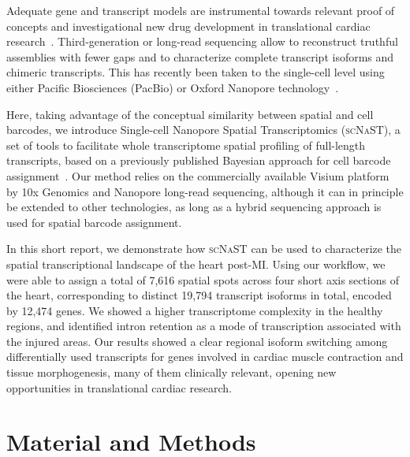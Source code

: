 \documentclass[utf8]{FrontiersinHarvard} %
\newcommand{\scnast}{\textsc{scNaST}\xspace}
\begin{document}
Adequate gene and transcript models are instrumental towards relevant proof of concepts and investigational new drug development in translational cardiac research~\citep{Muller2021:pig_transcriptome}. 
Third-generation or long-read sequencing allow to reconstruct truthful assemblies with fewer gaps and to characterize complete transcript isoforms and chimeric transcripts.
This has recently been taken to the single-cell level using either Pacific Biosciences (PacBio) or Oxford Nanopore technology~\citep{Gupta2018:ScISOr-Seq,Lebrigand2020:sicelore,Volden2020:R2C2_10x,Wang2021:scnapbar,Joglekar2021:spatial_brain}.

Here, taking advantage of the conceptual similarity between spatial and cell barcodes, we introduce Single-cell Nanopore Spatial Transcriptomics (\scnast), a set of tools to facilitate whole transcriptome spatial profiling of full-length transcripts, based on a previously published Bayesian approach for cell barcode assignment~\citep{Wang2021:scnapbar}. Our method relies on the commercially available Visium platform by 10x Genomics and Nanopore long-read sequencing, although it can in principle be extended to other technologies, as long as a hybrid sequencing approach is used for spatial barcode assignment. 

In this short report, we demonstrate how \scnast can be used to characterize the spatial transcriptional landscape of the heart post-MI.
Using our workflow, we were able to assign a total of 7,616 spatial spots across four short axis sections of the heart, corresponding to distinct 19,794 transcript isoforms in total, encoded by 12,474 genes.
We showed a higher transcriptome complexity in the healthy regions, and identified intron retention as a mode of transcription associated with the injured areas.
Our results showed a clear regional isoform switching among differentially used transcripts for genes involved in cardiac muscle contraction and tissue morphogenesis, many of them clinically relevant, opening new opportunities in translational cardiac research.


\section*{Material and Methods}
\end{document}
